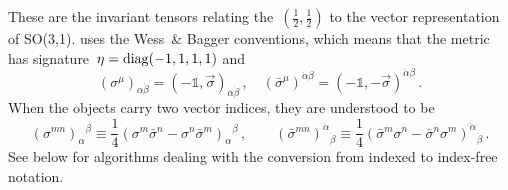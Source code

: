 
These are the invariant tensors relating the~$(\tfrac{1}{2},\tfrac{1}{2})$ to the vector representation of
SO(3,1). \Cdb uses the Wess~\& Bagger conventions,
which means that the metric has signature~$\eta = {\rm
  diag}(-1,1,1,1)$ and
\begin{equation}
(\sigma^{\mu})_{\alpha\dot{\beta}} = ( -{\mathbb 1}, \vec\sigma )_{\alpha\dot{\beta}}\,,\quad
(\bar{\sigma}^{\mu})^{\dot{\alpha}\beta} = (-{\mathbb 1}, -\vec\sigma)^{\dot{\alpha}\beta}\,.
\end{equation}
When the objects carry two vector indices, they are understood to be
\begin{equation}
(\sigma^{m n})_{\alpha}{}^{\beta} \equiv \frac{1}{4}( \sigma^m
  \bar{\sigma}^n - \sigma^n \bar{\sigma}^m)_{\alpha}{}^{\beta}\,,\quad\quad
(\bar{\sigma}^{m n})^{\dot{\alpha}}{}_{\dot{\beta}} \equiv
  \frac{1}{4}(\bar{\sigma}^m \sigma^{n}
- \bar{\sigma}^n \sigma^{m})^{\dot{\alpha}}{}_{\dot{\beta}}\,.
\end{equation}
See below for algorithms dealing with the conversion from indexed to
index-free notation.
